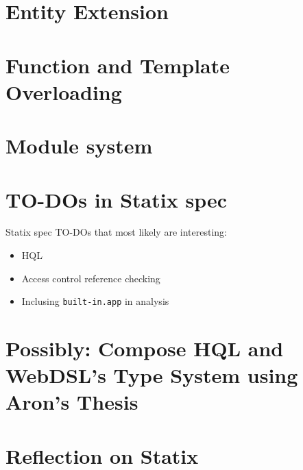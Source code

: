   \section{Entity Extension}

  \section{Function and Template Overloading}

  \section{Module system}

  \section{TO-DOs in Statix spec}
  
    Statix spec TO-DOs that most likely are interesting:
    \begin{itemize}
      \item HQL
      \item Access control reference checking
      \item Inclusing \texttt{built-in.app} in analysis
    \end{itemize}

  \section{Possibly: Compose HQL and WebDSL's Type System using Aron's Thesis}

  \section{Reflection on Statix}
